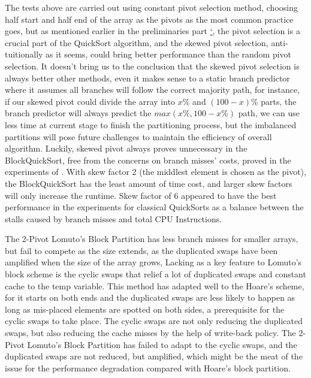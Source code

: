 \documentclass{article}
\begin{document}


The tests above are carried out using constant pivot selection method, choosing half start and half end of the array as the pivots as the most common practice goes,
but as mentioned earlier in the preliminaries part \hyperlink{ref:AnalysisOfBranchMissesInQuickSort}{`}, the pivot selection is a crucial part of the QuickSort algorithm, and the skewed pivot selection, anti-tuitionally as it seems, could bring better performance than the random pivot selection.
It doesn't bring us to the conclusion that the skewed pivot selection is always better other methods, even it makes sense to a static branch predictor where it assumes all branches will follow the correct majority path, for instance, if our skewed pivot could divide the array into $x\%$ and $(100-x)\%$ parts, the branch predictor will always predict the $max(x\%, 100-x\%)$ path,
we can use less time at current stage to finish the partitioning process, but the imbalanced partitions will pose future challenges to maintain the efficiency of overall algorithm. Luckily, skewed pivot always proves unnecessary in the BlockQuickSort, free from the concerns on branch misses' costs,
proved in the experiments of \cite{BlockQuickSort}. With skew factor 2 (the middlest element is chosen as the pivot), the BlockQuickSort has the least amount of time cost, and larger skew factors will only increase the runtime. Skew factor of 6 appeared to have the best performance in the experiments for classical QuickSorts as a balance between the stalls caused by branch misses and total CPU Instructions.

The 2-Pivot Lomuto's Block Partition has less branch misses for smaller arrays, but fail to compete as the size extends, as the duplicated swaps have been amplified when the size of the array grows, 
Lacking as a key feature to Lomuto's block scheme is the cyclic swaps that relief a lot of duplicated swaps and constant cache to the temp variable. This method has adapted well to the Hoare's scheme, for it starts on both ends and the duplicated swaps are less likely to happen as long as mis-placed elements are spotted on both sides, a prerequisite for the cyclic swaps to take place.
The cyclic swaps are not only reducing the duplicated swaps, but also reducing the cache misses by the help of write-back policy. The 2-Pivot Lomuto's Block Partition has failed to adapt to the cyclic swaps, and the duplicated swaps are not reduced, but amplified, which might be the meat of the issue for the performance degradation compared with Hoare's block partition. %
\end{document}
